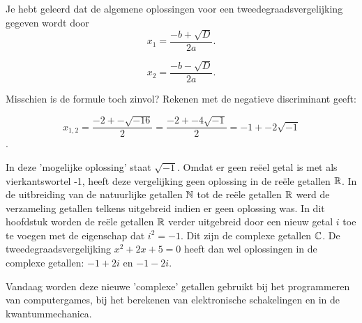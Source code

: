 \documentclass{ximera}
\begin{document}
\begin{image}     
\end{image}
    
    
    





Je hebt geleerd dat de algemene oplossingen voor een tweedegraadsvergelijking gegeven wordt door 
\[  
    x_{1} = \frac{-b + \sqrt{D}}{2a}. 
\]

\[  
    x_{2} = \frac{-b - \sqrt{D}}{2a}. 
\]

Misschien is de formule toch zinvol? Rekenen met de negatieve discriminant geeft:

\[ x_{1,2} = \frac{-2 +- \sqrt{-16}}{2} = \frac{-2 +- 4\sqrt{-1}}{2} = -1 +- 2\sqrt{-1}\]. 

In deze 'mogelijke oplossing' staat \(\sqrt{-1}\). Omdat er geen reëel getal is met als vierkantswortel -1, heeft deze vergelijking geen oplossing in de reële getallen \(\mathbb{R}\). In de uitbreiding van de natuurlijke getallen \(\mathbb{N}\) tot de reële getallen \(\mathbb{R}\) werd de verzameling getallen telkens uitgebreid indien er geen oplossing was. In dit hoofdstuk worden de reële getallen \(\mathbb{R}\) verder uitgebreid door een nieuw getal \(i\) toe te voegen met de eigenschap dat \(i^2 = -1\). Dit zijn de complexe getallen \(\mathbb{C}\). De tweedegraadsvergelijking \(x^2 + 2x + 5 = 0\) heeft dan wel oplossingen in de complexe getallen: \(-1 + 2i\)  en  \(-1-2i\).

Vandaag worden deze nieuwe 'complexe' getallen gebruikt bij het programmeren van computergames, bij het berekenen van elektronische schakelingen en in de kwantummechanica.
\end{document}
